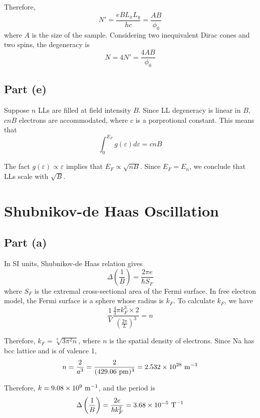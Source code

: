 \documentclass{article}
\begin{document}
Therefore,
\begin{equation*}
N'=\frac{eBL_xL_y}{hc}=\frac{AB}{\phi_0}
\end{equation*}
where $A$ is the size of the sample. Considering two inequivalent Dirac cones and two spins, the degeneracy is
\begin{equation*}
N=4N'=\frac{4AB}{\phi_0}
\end{equation*}

\subsection{Part (e)}
Suppose $n$ LLs are filled at field intensity $B$. Since LL degeneracy is linear in $B$, $cnB$ electrons are accommodated, where $c$ is a porprotional constant. This means that
\begin{equation*}
\int_0^{E_F}g(\varepsilon)d\varepsilon=cnB
\end{equation*}

The fact $g(\varepsilon)\propto\varepsilon$ implies that $E_F\propto\sqrt{nB}$. Since $E_F=E_n$, we conclude that LLs scale with $\sqrt{B}$.

\section{Shubnikov-de Haas Oscillation}
\subsection{Part (a)}
In SI units, Shubnikov-de Haas relation gives
\begin{equation*}
\Delta\left(\frac{1}{B}\right)=\frac{2\pi e}{\hbar S_F}
\end{equation*}
where $S_F$ is the extremal cross-sectional area of the Fermi surface. In free electron model, the Fermi surface is a sphere whose radius is $k_F$. To calculate $k_F$, we have
\begin{equation*}
\frac{1}{V}\frac{\frac{4}{3}\pi k_F^3\times 2}{\left(\frac{2\pi}{L}\right)^3}=n
\end{equation*}

Therefore, $k_F=\sqrt[3]{3\pi^2n}$, where $n$ is the spatial density of electrons. Since Na has bcc lattice and is of valence 1,
\begin{equation*}
n=\frac{2}{a^3}=\frac{2}{(429.06\textup{ pm})^3}=2.532\times 10^{28}\textup{ m}^{-3}
\end{equation*}

Therefore, $k=9.08\times 10^9\textup{ m}^{-1}$, and the period is
\begin{equation*}
\Delta\left(\frac{1}{B}\right)=\frac{2e}{\hbar k_F^2}=3.68\times 10^{-5}\textup{ T}^{-1}
\end{equation*}
\end{document}
